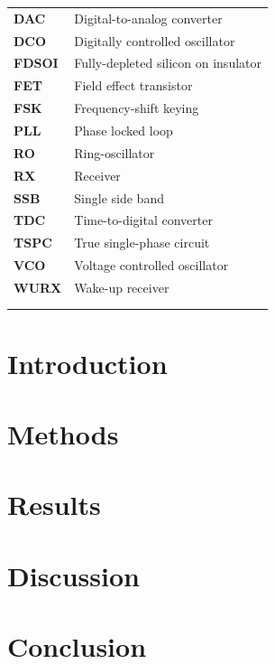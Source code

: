 \documentclass[10pt,a4paper]{article}
\begin{document}
	\begin{tabular}{@{}ll}
		\textbf{\textsf{DAC}}& 	Digital-to-analog converter\\
		\textbf{\textsf{DCO}}& 	Digitally controlled oscillator\\
		\textbf{\textsf{FDSOI}} &  Fully-depleted silicon on insulator	\\
		\textbf{\textsf{FET}} &  Field effect transistor	\\
		\textbf{\textsf{FSK}} &  Frequency-shift keying	\\
		\textbf{\textsf{PLL}} &  Phase locked loop	\\
		\textbf{\textsf{RO}}& 	Ring-oscillator\\
		\textbf{\textsf{RX}}& 	Receiver\\
		\textbf{\textsf{SSB}}& 	Single side band\\
		\textbf{\textsf{TDC}}& 	Time-to-digital converter \\
		\textbf{\textsf{TSPC}}& 	True single-phase circuit\\
		\textbf{\textsf{VCO}}& 	Voltage controlled oscillator\\
		\textbf{\textsf{WURX}}& 	Wake-up receiver\\
		& 	\\
		& 	\\
	\end{tabular}


	\pagebreak
	\FloatBarrier
    \section{Introduction}

    \section{Methods}

    \section{Results}

    \section{Discussion}

    \FloatBarrier
    \section{Conclusion}
    \lipsum[1]
\end{document}
